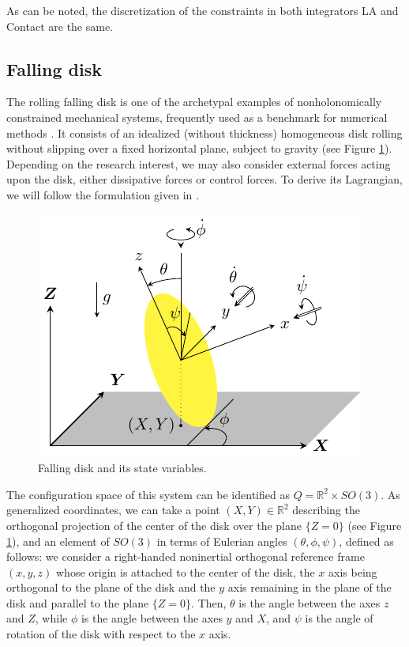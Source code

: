 \documentclass{aims}
\numberwithin{equation}{section}
\theoremstyle{definition}
\begin{document}
\vspace{12px}

As can be noted, the discretization of the constraints in both integrators LA and Contact are the same.

\subsection{Falling disk} \label{sec:falling_disk}

The rolling falling disk is one of the archetypal examples of nonholonomically constrained mechanical systems, frequently used as a benchmark for numerical methods \cite{bloch2015nonholonomic, modin2017makes}. It consists of an idealized (without thickness) homogeneous disk rolling without slipping over a fixed horizontal plane, subject to gravity (see Figure \ref{fig:disco_rodante_que_cae}). Depending on the research interest, we may also consider external forces acting upon the disk, either dissipative forces or control forces. To derive its Lagrangian, we will follow the formulation given in \cite{paris2002disk}. 

\begin{figure}
  \centering
  \includegraphics[scale=1.2]{fig/disco_que_cae.pdf}
  \caption{Falling disk and its state variables.}
  \label{fig:disco_rodante_que_cae}
\end{figure}

The configuration space of this system can be identified as $Q= \mathbb{R}^2\times SO(3)$. As generalized coordinates, we can take a point $(X, Y)\in \mathbb{R}^2$ describing the orthogonal projection of the center of the disk over the plane $\{Z = 0\}$ (see Figure \ref{fig:disco_rodante_que_cae}), and an element of $SO(3)$ in terms of Eulerian angles $(\theta, \phi, \psi)$, defined as follows: we consider a right-handed noninertial orthogonal reference frame $(x, y, z)$ whose origin is attached to the center of the disk, the $x$ axis being orthogonal to the plane of the disk and the $y$ axis remaining in the plane of the disk and parallel to the plane $\{Z = 0\}$. Then, $\theta$ is the angle between the axes $z$ and $Z$, while $\phi$ is the angle between the axes $y$ and $X$, and $\psi$ is the angle of rotation of the disk with respect to the $x$ axis.
\end{document}
